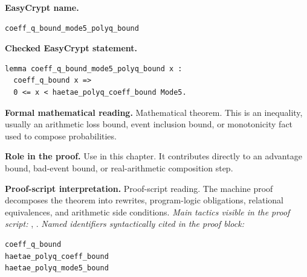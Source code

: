 \begin{formaltheorem}
\noindent\textbf{EasyCrypt name.}
\begin{lstlisting}[language=EasyCrypt,basicstyle=\ttfamily\scriptsize]
coeff_q_bound_mode5_polyq_bound
\end{lstlisting}
\noindent\textbf{Checked EasyCrypt statement.}
\begin{lstlisting}[language=EasyCrypt,basicstyle=\ttfamily\scriptsize]
lemma coeff_q_bound_mode5_polyq_bound x :
  coeff_q_bound x =>
  0 <= x < haetae_polyq_coeff_bound Mode5.
\end{lstlisting}
\noindent\textbf{Formal mathematical reading.}
Mathematical theorem. This is an inequality, usually an arithmetic loss bound, event inclusion bound, or monotonicity fact used to compose probabilities.

\noindent\textbf{Role in the proof.}
Use in this chapter. It contributes directly to an advantage bound, bad-event bound, or real-arithmetic composition step.

\noindent\textbf{Proof-script interpretation.}
Proof-script reading. The machine proof decomposes the theorem into rewrites, program-logic obligations, relational equivalences, and arithmetic side conditions.
\emph{Main tactics visible in the proof script:} , .
\emph{Named identifiers syntactically cited in the proof block:}
\begin{lstlisting}[language=EasyCrypt,basicstyle=\ttfamily\scriptsize]
coeff_q_bound
haetae_polyq_coeff_bound
haetae_polyq_mode5_bound
\end{lstlisting}

\end{formaltheorem}

